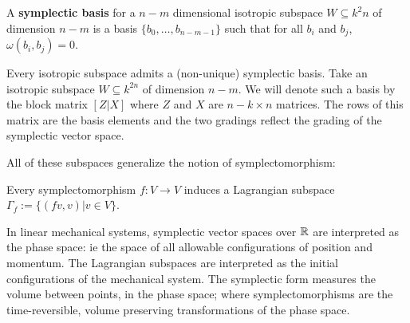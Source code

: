 \begin{definition}
A {\bf symplectic basis} for a $n-m$ dimensional isotropic subspace $W \subseteq k^2n$ of dimension $n-m$ is a basis $\{b_0,\ldots, b_{n-m-1}\}$ such that for all $b_i$ and $b_j$, $\omega(b_i,b_j)=0$.
\end{definition}
Every isotropic subspace admits a (non-unique) symplectic basis.  Take an isotropic subspace $W \subseteq k^{2n}$ of dimension $n-m$.  We will denote such a basis by the block matrix $[Z|X]$ where $Z$ and $X$ are  $n-k\times n$ matrices.  The rows of this matrix are the basis elements and the two gradings reflect the grading of the symplectic vector space.


All of these subspaces generalize the notion of symplectomorphism:
\begin{lemma}
Every symplectomorphism $f:V\to V$ induces a Lagrangian subspace $\Gamma_f:=\{ (fv, v) | v \in V \}$.
\end{lemma}
In linear mechanical systems, symplectic vector spaces over $\mathbb{R}$ are interpreted as  the phase space: ie the space of all allowable configurations of position and momentum.  The Lagrangian subspaces are interpreted as the initial configurations of the mechanical system. The symplectic form measures the volume between points, in the phase space; where symplectomorphisms are the time-reversible, volume preserving transformations of the phase space.

